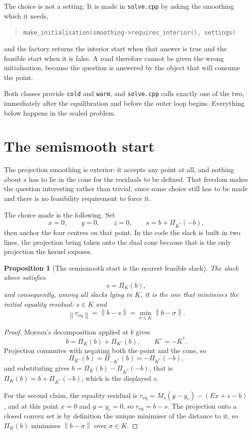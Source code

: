 \documentclass[a4paper,11pt]{book}
\theoremstyle{plain}
\newtheorem{proposition}[theorem]{Proposition}
\theoremstyle{definition}
\theoremstyle{remark}
\numberwithin{equation}{chapter}
\numberwithin{algorithm}{chapter}
\newcommand{\proj}[2]{\Pi_{#2}\!\left(#1\right)}
\newcommand{\norm}[1]{\left\|#1\right\|}
\begin{document}
	The choice is not a setting. It is made in \texttt{solve.cpp} by asking the
	smoothing which it needs,
	\begin{quote}
		\texttt{make\_initialisation(smoothing->requires\_interior(), settings)}
	\end{quote}
	and the factory returns the interior start when that answer is true and the
	feasible start when it is false. A road therefore cannot be given the wrong
	initialisation, because the question is answered by the object that will
	consume the point.

	Both classes provide \texttt{cold} and \texttt{warm}, and
	\texttt{solve.cpp} calls exactly one of the two, immediately after the
	equilibration and before the outer loop begins. Everything below happens in
	the scaled problem.

	\section{The semismooth start}

	The projection smoothing is exterior: it accepts any point at all, and
	nothing about $s$ has to lie in the cone for the residuals to be defined.
	That freedom makes the question interesting rather than trivial, since some
	choice still has to be made and there is no feasibility requirement to force
	it.

	The choice made is the following. Set
	\[
	x=0,
	\qquad
	y=0,
	\qquad
	z=0,
	\qquad
	s=b+\proj{-b}{K^*} ,
	\]
	then anchor the four centres on that point. In the code the slack is built in
	two lines, the projection being taken onto the dual cone because that is the
	only projection the kernel exposes.

	\begin{proposition}[The semismooth start is the nearest feasible slack]
		\label{prop:feasiblestart}
		The slack above satisfies
		\begin{equation}
			s=\proj{b}{K} ,
		\end{equation}
		and consequently, among all slacks lying in $K$, it is the one that
		minimises the initial equality residual: $s\in K$ and
		\begin{equation}
			\norm{r_{\mathrm{eq}}}=\norm{b-s}
			=\min_{\sigma\in K}\norm{b-\sigma} .
		\end{equation}
	\end{proposition}

	\begin{proof}
		Moreau's decomposition applied at $b$ gives
		\[
		b=\proj{b}{K}+\proj{b}{K^{\circ}},
		\qquad
		K^{\circ}=-K^* .
		\]
		Projection commutes with negating both the point and the cone, so
		\[
		\proj{b}{K^{\circ}}=\proj{b}{-K^*}=-\proj{-b}{K^*} ,
		\]
		and substituting gives $b=\proj{b}{K}-\proj{-b}{K^*}$, that is
		$\proj{b}{K}=b+\proj{-b}{K^*}$, which is the displayed $s$.

		For the second claim, the equality residual is
		$r_{\mathrm{eq}}=M_s(y-y_c)-(Ex+s-b)$, and at this point $x=0$ and
		$y=y_c=0$, so $r_{\mathrm{eq}}=b-s$. The projection onto a closed convex
		set is by definition the unique minimiser of the distance to it, so
		$\proj{b}{K}$ minimises $\norm{b-\sigma}$ over $\sigma\in K$.
	\end{proof}
\end{document}

